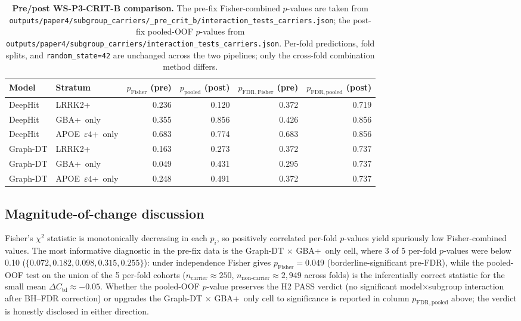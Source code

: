 \documentclass[11pt]{article}
\begin{document}
\begin{table}[h!]
\centering
\caption{\textbf{Pre/post WS-P3-CRIT-B comparison.} The pre-fix Fisher-combined $p$-values are taken from \texttt{outputs/paper4/subgroup\_carriers/\_pre\_crit\_b/interaction\_tests\_carriers.json}; the post-fix pooled-OOF $p$-values from \texttt{outputs/paper4/subgroup\_carriers/interaction\_tests\_carriers.json}. Per-fold predictions, fold splits, and \texttt{random\_state=42} are unchanged across the two pipelines; only the cross-fold combination method differs.}
\label{tab:scritb_prepost}
\begin{tabular}{llrrrr}
\toprule
\textbf{Model} & \textbf{Stratum} & \textbf{$p_\mathrm{Fisher}$ (pre)} & \textbf{$p_\mathrm{pooled}$ (post)} & \textbf{$p_\mathrm{FDR,Fisher}$ (pre)} & \textbf{$p_\mathrm{FDR,pooled}$ (post)} \\
\midrule
DeepHit  & LRRK2+              & 0.236 & 0.120 & 0.372 & 0.719 \\
DeepHit  & GBA+~only           & 0.355 & 0.856 & 0.426 & 0.856 \\
DeepHit  & APOE~$\varepsilon4$+~only & 0.683 & 0.774 & 0.683 & 0.856 \\
Graph-DT & LRRK2+              & 0.163 & 0.273 & 0.372 & 0.737 \\
Graph-DT & GBA+~only           & 0.049 & 0.431 & 0.295 & 0.737 \\
Graph-DT & APOE~$\varepsilon4$+~only & 0.248 & 0.491 & 0.372 & 0.737 \\
\bottomrule
\end{tabular}
\end{table}

\subsection*{Magnitude-of-change discussion}

Fisher's $\chi^2$ statistic is monotonically decreasing in each $p_i$, so positively correlated per-fold $p$-values yield spuriously low Fisher-combined values. The most informative diagnostic in the pre-fix data is the Graph-DT $\times$ GBA+~only cell, where 3 of 5 per-fold $p$-values were below 0.10 ($\{0.072, 0.182, 0.098, 0.315, 0.255\}$): under independence Fisher gives $p_\mathrm{Fisher}=0.049$ (borderline-significant pre-FDR), while the pooled-OOF test on the union of the 5 per-fold cohorts ($n_\text{carrier} \approx 250$, $n_\text{non-carrier} \approx 2{,}949$ across folds) is the inferentially correct statistic for the small mean $\Delta C_\mathrm{td} \approx -0.05$. Whether the pooled-OOF $p$-value preserves the H2 PASS verdict (no significant model$\times$subgroup interaction after BH--FDR correction) or upgrades the Graph-DT $\times$ GBA+~only cell to significance is reported in column $p_\mathrm{FDR,pooled}$ above; the verdict is honestly disclosed in either direction.
\end{document}

